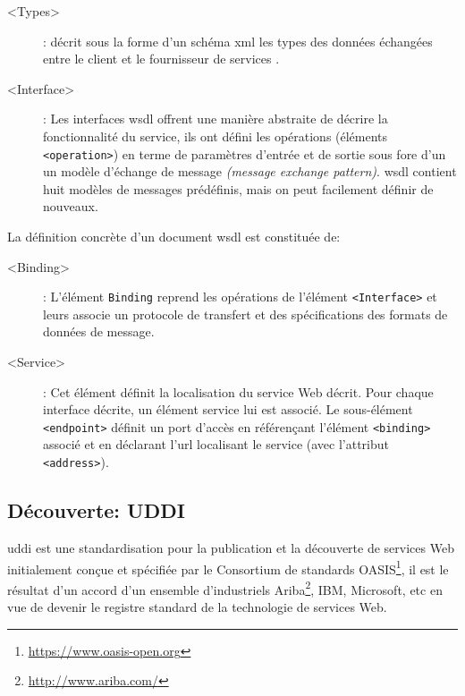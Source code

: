   \SpecialItem
  \renewcommand{\descriptionlabel}[1]{\hspace{0.5cm}\texttt{#1}}
  \begin{description}
  \item[<Types>]: décrit sous la forme d'un schéma \acrshort{xml} les
    types des données échangées entre le client et le fournisseur de
    services \cite{part20012}.

  \item[<Interface>]: Les interfaces \acrshort{wsdl} offrent une
    manière abstraite de décrire la fonctionnalité du service, ils ont
    défini les opérations (éléments \texttt{<operation>}) en terme de
    paramètres d'entrée et de sortie sous fore d'un un modèle
    d'échange de message \textit{(message exchange
      pattern)}. \acrshort{wsdl} contient huit modèles de messages
    prédéfinis, mais on peut facilement définir de nouveaux.
  \end{description}
  \enddescription

  La définition concrète d'un document \acrshort{wsdl} est constituée
  de:

  \SpecialItem
  \renewcommand{\descriptionlabel}[1]{\hspace{0.5cm}\texttt{#1}}
  \begin{description}
  \item[<Binding>]: L'élément \texttt{Binding} reprend les opérations
    de l'élément \texttt{<Interface>} et leurs associe un protocole de
    transfert et des spécifications des formats de données de message.

  \item[<Service>]: Cet élément définit la localisation du service Web
    décrit. Pour chaque interface décrite, un élément service lui est
    associé. Le sous-élément \texttt{<endpoint>} définit un port
    d’accès en référençant l'élément \texttt{<binding>} associé et en
    déclarant l'\acrshort{url} localisant le service (avec l'attribut
    \texttt{<address>}).
  \end{description}

  \subsection{Découverte: UDDI}
  \label{sec:uddi}
  \acrshort{uddi} \cite{clement2004uddi} est une standardisation pour
  la publication et la découverte de services Web initialement conçue
  et spécifiée par le Consortium de standards
  OASIS\footnote{\url{https://www.oasis-open.org}}, il est le résultat
  d'un accord d'un ensemble d'industriels
  Ariba\footnote{\url{http://www.ariba.com/}}, IBM, Microsoft, etc en
  vue de devenir le registre standard de la technologie de services
  Web. \medskip

